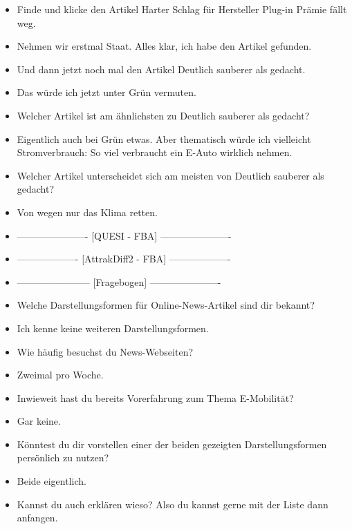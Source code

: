 {\begin{itemize}[]
            \item {} Finde und klicke den Artikel \flqq Harter Schlag für Hersteller Plug-in Prämie fällt weg\frqq{}.
            \item {} Nehmen wir erstmal Staat. Alles klar, ich habe den Artikel gefunden.
            \item {} Und dann jetzt noch mal den Artikel \flqq Deutlich sauberer als gedacht\frqq{}.
            \item {} Das würde ich jetzt unter Grün vermuten.
            \item {} Welcher Artikel ist am ähnlichsten zu \flqq Deutlich sauberer als gedacht\frqq{}?
            \item {} Eigentlich auch bei Grün etwas.
                  Aber thematisch würde ich vielleicht \flqq Stromverbrauch: So viel verbraucht ein E-Auto wirklich\frqq{} nehmen.
            \item {} Welcher Artikel unterscheidet sich am meisten von \flqq Deutlich sauberer als gedacht\frqq{}?
            \item {} \flqq Von wegen nur das Klima retten\frqq{}.
            \item {----------------------} [QUESI - FBA] {----------------------}
            \item {-------------------} [AttrakDiff2 - FBA] {-------------------}
            \item {-----------------------} [Fragebogen] {----------------------}
            \item {} Welche Darstellungsformen für Online-News-Artikel sind dir bekannt?
            \item {} Ich kenne keine weiteren Darstellungsformen.
            \item {} Wie häufig besuchst du News-Webseiten?
            \item {} Zweimal pro Woche.
            \item {} Inwieweit hast du bereits Vorerfahrung zum Thema E-Mobilität?
            \item {} Gar keine.
            \item {} Könntest du dir vorstellen einer der beiden gezeigten Darstellungsformen persönlich zu nutzen?
            \item {} Beide eigentlich.
            \item {} Kannst du auch erklären wieso? Also du kannst gerne mit der Liste dann anfangen.

\end{itemize}}
